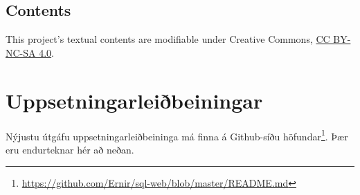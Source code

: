 \documentclass[a4paper,12pt,twoside,BCOR=10mm]{scrbook}
\begin{document}
\section{Contents}\label{contents}

This project's textual contents are modifiable under Creative Commons,
\href{http://creativecommons.org/licenses/by-nc-sa/4.0/}{CC BY-NC-SA
4.0}.

\chapter{Uppsetningarleiðbeiningar}
\label{sec:installation}
Nýjustu útgáfu uppsetningarleiðbeininga má finna á Github-síðu höfundar\footnote{\url{https://github.com/Ernir/sql-web/blob/master/README.md}}. Þær eru endurteknar hér að neðan. %
\end{document}
